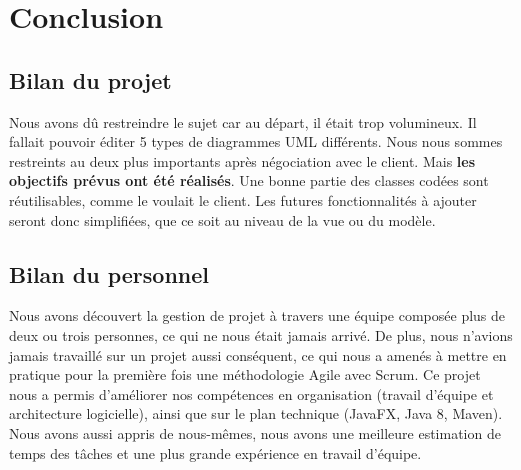 \documentclass[hidelinks, 10pt,a4paper]{article}
\begin{document}
\section{Conclusion}
  \subsection{Bilan du projet}
    Nous avons dû restreindre le sujet car au départ, il était trop volumineux. 
    Il fallait pouvoir éditer 5 types de diagrammes UML différents. Nous nous sommes restreints au deux plus importants après négociation avec le client.
    Mais \textbf{les objectifs prévus ont été réalisés}. 
    Une bonne partie des classes codées sont réutilisables, comme le voulait le client.
    Les futures fonctionnalités à ajouter seront donc simplifiées, que ce soit au niveau de la vue ou du modèle.
    
  \subsection{Bilan du personnel}
    Nous avons découvert la gestion de projet à travers une équipe composée plus de deux ou trois personnes, ce qui ne nous était jamais arrivé. 
    De plus, nous n'avions jamais travaillé sur un projet aussi conséquent, ce qui nous a amenés à mettre en pratique pour la première fois une méthodologie Agile avec Scrum.
    Ce projet nous a permis d'améliorer nos compétences en organisation (travail d'équipe et architecture logicielle), ainsi que sur le plan technique (JavaFX, Java 8, Maven).
    Nous avons aussi appris de nous-mêmes, nous avons une meilleure estimation de temps des tâches et une plus grande expérience en travail d'équipe.
\end{document}
